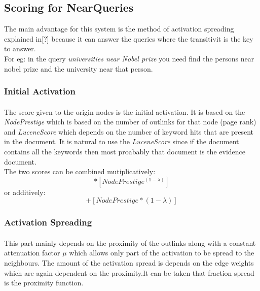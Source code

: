 \documentclass[a4paper,12pt]{report}
\begin{document}
\subsection{Scoring for NearQueries}
The main advantage for this system is the method of activation spreading explained in[?] because it can answer the queries where the transitivit is the key to answer.\\
For eg: in the query \textit{universities near Nobel prize} you need find the persons near nobel prize and the university near that person.
\subsubsection{Initial Activation}
\paragraph*{}
The score given to the origin nodes is the initial activation. It is based on the \textit{NodePrestige} which is based on the number of outlinks for that node (page rank) and \textit{LuceneScore} which depends on the number of keyword hits that are present in the document. It is natural to use the \textit{LuceneScore} since if the document contains all the keywords then most proabably that document is the evidence document.\\
The two scores can be combined mutiplicatively:\\ \begin{equation}[LuceneScore ^ \lambda] * [NodePrestige ^ {(1 - \lambda)}]\end{equation}  or additively:\begin{equation}[LuceneScore * \lambda] + [NodePrestige * {(1 - \lambda)}]\end{equation}
\subsubsection{Activation Spreading}
\paragraph*{}
This part mainly depends on the proximity of the outlinks along with a constant attenuation factor $\mu$ which allows only part of the activation to be spread to the neighbours. The amount of the activation spread is depends on the edge weights which are again dependent on the proximity.It can be taken that fraction spread is the proximity function. 
\end{document}
